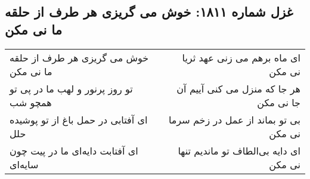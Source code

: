 \begin{center}
\section*{غزل شماره ۱۸۱۱: خوش می گریزی هر طرف از حلقه ما نی مکن}
\label{sec:1811}
\begin{longtable}{l p{0.5cm} r}
خوش می گریزی هر طرف از حلقه ما نی مکن
&&
ای ماه برهم می زنی عهد ثریا نی مکن
\\
تو روز پرنور و لهب ما در پی تو همچو شب
&&
هر جا که منزل می کنی آییم آن جا نی مکن
\\
ای آفتابی در حمل باغ از تو پوشیده حلل
&&
بی تو بماند از عمل در زخم سرما نی مکن
\\
ای آفتابت دایه‌ای ما در پیت چون سایه‌ای
&&
ای دایه بی‌الطاف تو ماندیم تنها نی مکن
\\
\end{longtable}
\end{center}
